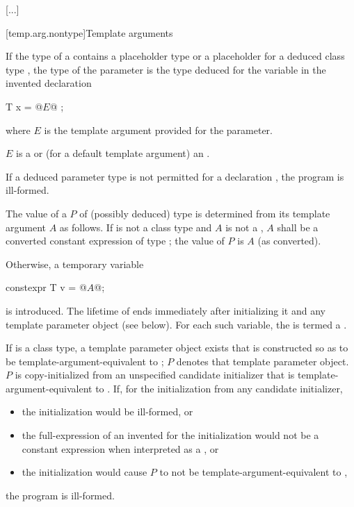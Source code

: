 \documentclass{wg21}
\begin{document}
\textcolor{noteclr}{[...]}

[temp.arg.nontype]{Template  arguments}

\pnum
If the type  of a  
contains a placeholder type 
or a placeholder for a deduced class type ,
the type of the parameter is the type deduced
for the variable  in the invented declaration
\begin{codeblock}
    T x = @$E$@ ;
\end{codeblock}
where $E$ is the template argument provided for the parameter.
\begin{note}
    $E$ is a  or
    (for a default template argument) an .
\end{note}
If a deduced parameter type is not permitted
for a  declaration ,
the program is ill-formed.

\pnum
The value of a   $P$
of (possibly deduced) type 
is determined from its template argument $A$ as follows.
If  is not a class type and
$A$ is not a ,
$A$ shall be a converted constant expression 
of type ; the value of $P$ is $A$ (as converted).

\pnum
Otherwise, a temporary variable
\begin{codeblock}
    constexpr T v = @$A$@;
\end{codeblock}
is introduced.
The lifetime of  ends immediately after initializing it and
any template parameter object (see below).
For each such variable,
the  
is termed a .

\pnum
If  is a class type,
a template parameter object exists
that is constructed so as to be template-argument-equivalent to ;
$P$ denotes that template parameter object.
$P$ is copy-initialized from an unspecified candidate initializer
that is template-argument-equivalent to .
If, for the initialization from any candidate initializer,
\begin{itemize}
    \item
    the initialization would be ill-formed, or
    \item
    the full-expression of an invented 
    for the initialization would not be a constant expression
    when interpreted as a , or
    \item
    the initialization would cause $P$ to not be template-argument-equivalent to ,
\end{itemize}
the program is ill-formed.
\end{document}
